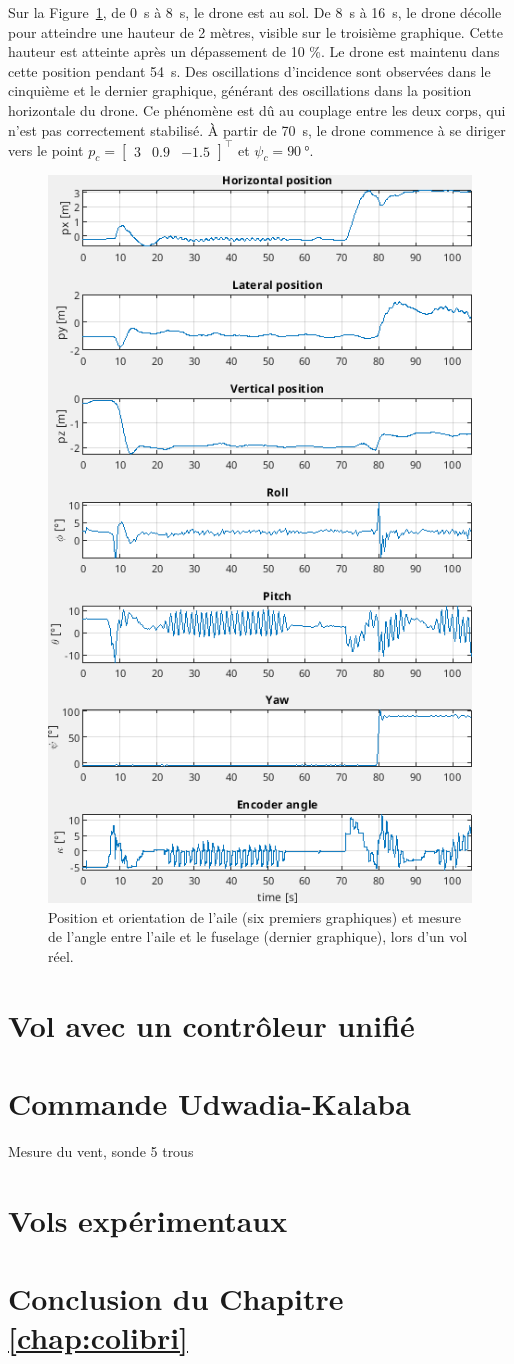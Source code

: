Sur la Figure~\ref{fig:colibri_flight}, de \SI{0}{\second} à \SI{8}{\second}, le drone est au sol. De \SI{8}{\second} à \SI{16}{\second}, le drone décolle pour atteindre une hauteur de 2 mètres, visible sur le troisième graphique. Cette hauteur est atteinte après un dépassement de 10 \%. Le drone est maintenu dans cette position pendant \SI{54}{\second}. Des oscillations d'incidence sont observées dans le cinquième et le dernier graphique, générant des oscillations dans la position horizontale du drone. Ce phénomène est dû au couplage entre les deux corps, qui n'est pas correctement stabilisé. À partir de \SI{70}{\second}, le drone commence à se diriger vers le point $p_{c} = \begin{bmatrix} 3 & 0.9 & -1.5 \end{bmatrix}^\top$ et $\psi_{c}=\SI{90}{\degree}$.
\begin{figure}[ht!]
\centering
    \includegraphics[width=0.6\columnwidth,angle=0]{figures/colibri_flight.png}
    \caption{Position et orientation de l'aile (six premiers graphiques) et mesure de l'angle entre l'aile et le fuselage (dernier graphique), lors d'un vol réel. }
    \label{fig:colibri_flight}
\end{figure}

\section{Vol avec un contrôleur unifié}

\section{Commande Udwadia-Kalaba}

Mesure du vent, sonde 5 trous

\section{Vols expérimentaux}

\section{Conclusion du Chapitre \ref{chap:colibri}}






